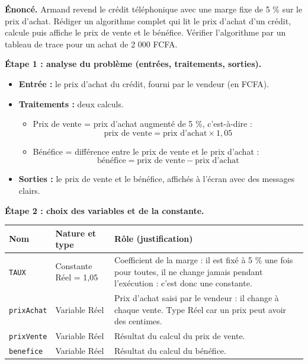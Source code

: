 \documentclass[11pt]{article}
\newcommand{\cle}[1]{{\popxbold\color{popdark}#1}}
\begin{document}
\begin{exoresolu}
\textbf{Énoncé.} Armand revend le crédit téléphonique avec une marge fixe de 5 \% sur le prix d'achat. Rédiger un algorithme complet qui lit le prix d'achat d'un crédit, calcule puis affiche le prix de vente et le bénéfice. Vérifier l'algorithme par un tableau de trace pour un achat de 2 000 FCFA.

\tcblower

\textbf{Étape 1 : analyse du problème (entrées, traitements, sorties).}

\begin{itemize}
\item \textbf{Entrée :} le prix d'achat du crédit, fourni par le vendeur (en FCFA).
\item \textbf{Traitements :} deux calculs.
\begin{itemize}
\item Prix de vente = prix d'achat augmenté de 5 \%, c'est-à-dire :
\[ \text{prix de vente} = \text{prix d'achat} \times 1{,}05 \]
\item Bénéfice = différence entre le prix de vente et le prix d'achat :
\[ \text{bénéfice} = \text{prix de vente} - \text{prix d'achat} \]
\end{itemize}
\item \textbf{Sorties :} le prix de vente et le bénéfice, affichés à l'écran avec des messages clairs.
\end{itemize}

\textbf{Étape 2 : choix des variables et de la constante.}

\begin{center}
\begin{tabularx}{\linewidth}{|l|l|X|}
\hline
\rowcolor{popblueL} \textbf{Nom} & \textbf{Nature et type} & \textbf{Rôle (justification)} \\
\hline
\texttt{TAUX} & Constante Réel = 1,05 & Coefficient de la marge : il est fixé à 5 \% une fois pour toutes, il ne change jamais pendant l'exécution : c'est donc une \cle{constante}. \\
\hline
\texttt{prixAchat} & Variable Réel & Prix d'achat saisi par le vendeur : il change à chaque vente. Type Réel car un prix peut avoir des centimes. \\
\hline
\texttt{prixVente} & Variable Réel & Résultat du calcul du prix de vente. \\
\hline
\texttt{benefice} & Variable Réel & Résultat du calcul du bénéfice. \\
\hline
\end{tabularx}
\end{center}


\end{exoresolu}
\end{document}
